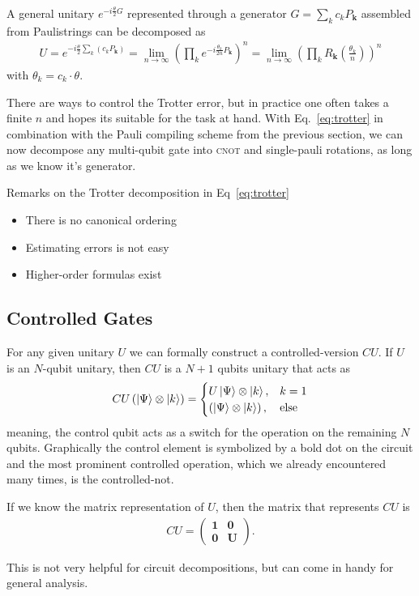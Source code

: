 \begin{theorem*}
A general unitary $e^{-i\frac{\theta}{2}G}$ represented through a generator $G=\sum_k c_k P_\mathbf{k}$ assembled from Paulistrings can be decomposed as
\begin{align}
    U = e^{-i\frac{\theta}{2} 
    \sum_k\left( c_k P_\mathbf{k} \right)} = \lim_{n\rightarrow\infty} \left(\prod_{k} e^{-i\frac{\theta_k}{2n} P_\mathbf{k}} \right)^n= \lim_{n\rightarrow\infty} \left( \prod_k R_\mathbf{k}\left({\frac{\theta_k}{n}}\right)\right)^n\label{eq:trotter}
\end{align}  
with $\theta_k = c_k\cdot \theta$.
\end{theorem*}
There are ways to control the Trotter error, but in practice one often takes a finite $n$ and hopes its suitable for the task at hand. With Eq.~\eqref{eq:trotter} in combination with the Pauli compiling scheme from the previous section, we can now decompose any multi-qubit gate into \textsc{cnot} and single-pauli rotations, as long as we know it's generator.

Remarks on the Trotter decomposition in Eq~\eqref{eq:trotter}
\begin{itemize}
    \item There is no canonical ordering
    \item Estimating errors is not easy
    \item Higher-order formulas exist
\end{itemize}

\subsection{Controlled Gates}
For any given unitary $U$ we can formally construct a controlled-version $CU$. If $U$ is an $N$-qubit unitary, then $CU$ is a $N+1$ qubits unitary that acts as
\begin{align}
    CU\left(\ket{\Psi}\otimes\ket{k}\right) = \begin{cases}
        U\ket{\Psi}\otimes \ket{k}, & k=1 \\
        \left(\ket{\Psi}\otimes\ket{k}\right), & \text{else}
    \end{cases}
\end{align}
meaning, the control qubit acts as a  switch for the operation on the remaining $N$ qubits. Graphically the control element is symbolized by a bold dot on the circuit and the most prominent controlled operation, which we already encountered many times, is the controlled-not.
\begin{theorem*}
If we know the matrix representation of $U$, then the matrix that represents $CU$ is
\begin{align}
   CU =  \begin{pmatrix}
        \textbf{1} & \textbf{0} \\
        \textbf{0} & \textbf{U}
    \end{pmatrix}.
\end{align}
\end{theorem*}
This is not very helpful for circuit decompositions, but can come in handy for general analysis.

